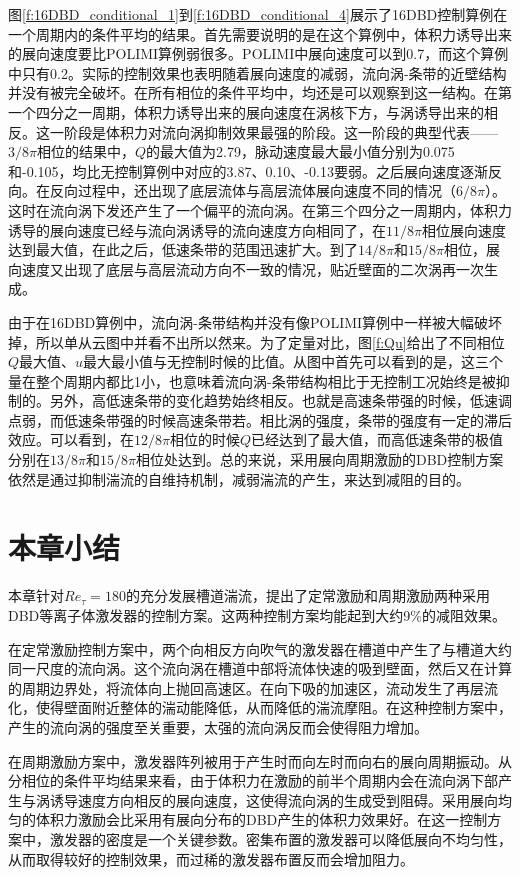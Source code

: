 图\ref{f:16DBD_conditional_1}到\ref{f:16DBD_conditional_4}展示了16DBD控制算例在一个周期内的条件平均的结果。首先需要说明的是在这个算例中，体积力诱导出来的展向速度要比POLIMI算例弱很多。POLIMI中展向速度可以到0.7，而这个算例中只有0.2。实际的控制效果也表明随着展向速度的减弱，流向涡-条带的近壁结构并没有被完全破坏。在所有相位的条件平均中，均还是可以观察到这一结构。在第一个四分之一周期，体积力诱导出来的展向速度在涡核下方，与涡诱导出来的相反。这一阶段是体积力对流向涡抑制效果最强的阶段。这一阶段的典型代表——$3/8\pi$相位的结果中，$Q$的最大值为2.79，脉动速度最大最小值分别为0.075和-0.105，均比无控制算例中对应的3.87、0.10、-0.13要弱。之后展向速度逐渐反向。在反向过程中，还出现了底层流体与高层流体展向速度不同的情况（$6/8\pi$）。这时在流向涡下发还产生了一个偏平的流向涡。在第三个四分之一周期内，体积力诱导的展向速度已经与流向涡诱导的流向速度方向相同了，在$11/8\pi$相位展向速度达到最大值，在此之后，低速条带的范围迅速扩大。到了$14/8\pi$和$15/8\pi$相位，展向速度又出现了底层与高层流动方向不一致的情况，贴近壁面的二次涡再一次生成。

由于在16DBD算例中，流向涡-条带结构并没有像POLIMI算例中一样被大幅破坏掉，所以单从云图中并看不出所以然来。为了定量对比，图\ref{f:Qu}给出了不同相位$Q$最大值、$u$最大最小值与无控制时候的比值。从图中首先可以看到的是，这三个量在整个周期内都比1小，也意味着流向涡-条带结构相比于无控制工况始终是被抑制的。另外，高低速条带的变化趋势始终相反。也就是高速条带强的时候，低速调点弱，而低速条带强的时候高速条带若。相比涡的强度，条带的强度有一定的滞后效应。可以看到，在$12/8\pi$相位的时候$Q$已经达到了最大值，而高低速条带的极值分别在$13/8\pi$和$15/8\pi$相位处达到。总的来说，采用展向周期激励的DBD控制方案依然是通过抑制湍流的自维持机制，减弱湍流的产生，来达到减阻的目的。

\section{本章小结}
本章针对$Re_\tau=180$的充分发展槽道湍流，提出了定常激励和周期激励两种采用DBD等离子体激发器的控制方案。这两种控制方案均能起到大约9\%的减阻效果。

在定常激励控制方案中，两个向相反方向吹气的激发器在槽道中产生了与槽道大约同一尺度的流向涡。这个流向涡在槽道中部将流体快速的吸到壁面，然后又在计算的周期边界处，将流体向上抛回高速区。在向下吸的加速区，流动发生了再层流化，使得壁面附近整体的湍动能降低，从而降低的湍流摩阻。在这种控制方案中，产生的流向涡的强度至关重要，太强的流向涡反而会使得阻力增加。

在周期激励方案中，激发器阵列被用于产生时而向左时而向右的展向周期振动。从分相位的条件平均结果来看，由于体积力在激励的前半个周期内会在流向涡下部产生与涡诱导速度方向相反的展向速度，这使得流向涡的生成受到阻碍。采用展向均匀的体积力激励会比采用有展向分布的DBD产生的体积力效果好。在这一控制方案中，激发器的密度是一个关键参数。密集布置的激发器可以降低展向不均匀性，从而取得较好的控制效果，而过稀的激发器布置反而会增加阻力。